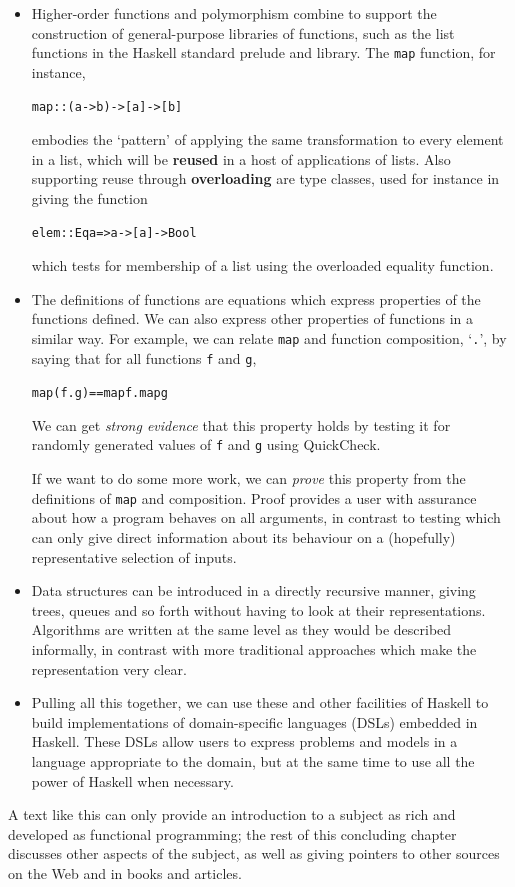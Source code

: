 \begin{itemize}

\item Higher-order functions and polymorphism combine to support the
construction of general-purpose libraries of functions, such as the list
functions in the Haskell standard prelude and library. The \texttt{map}
function, for instance,
\begin{alltt}
map :: (a -> b) -> [a] -> [b]
\end{alltt}
embodies the `pattern' of applying the same transformation to every
element in a list, which will be \textbf{reused} in a host of applications of
lists.
\itempar
Also supporting reuse through \textbf{overloading} are type classes, used for
instance in giving the function
\begin{alltt}
elem :: Eq a => a -> [a] -> Bool
\end{alltt}
which tests for membership of a list using the overloaded equality
function.

\item The definitions of functions are equations which express
properties of the functions defined. We can also express other properties of functions in a similar way. For example, we can relate 
\texttt{map} and
function composition, `\texttt{.}', by saying that  for all functions \texttt{f} and \texttt{g},
\begin{alltt}
map (f . g) ==  map f . map g
\end{alltt}
We can get \emph{strong evidence} that this property holds by testing it for randomly generated values of \texttt{f} and \texttt{g} using QuickCheck. 

\noindent
If we want to do some more work, we can \emph{prove} this property from the definitions of \texttt{map} and composition. 
Proof provides a user with assurance about how a program behaves on all arguments,
in contrast to testing which can only give direct information about its
behaviour on a (hopefully) representative selection of inputs.

\item Data structures can be introduced in a directly recursive manner,
giving trees, queues and so forth without having to look at their
representations. Algorithms are written at the same level as they would
be described informally, in contrast with more traditional approaches
which make the representation very clear.

\item Pulling all this together, we can use these and other facilities of Haskell to build implementations of domain-specific languages (DSLs) embedded in Haskell. These DSLs allow users to express problems and models in a language appropriate to the domain, but at the same time to use all the power of Haskell when necessary.

\end{itemize} 
A text like this can only provide an introduction to a subject as rich
and developed as functional programming; the rest of this concluding
chapter discusses other aspects of the subject, as well as giving pointers to 
other sources on the Web and in books and articles.

